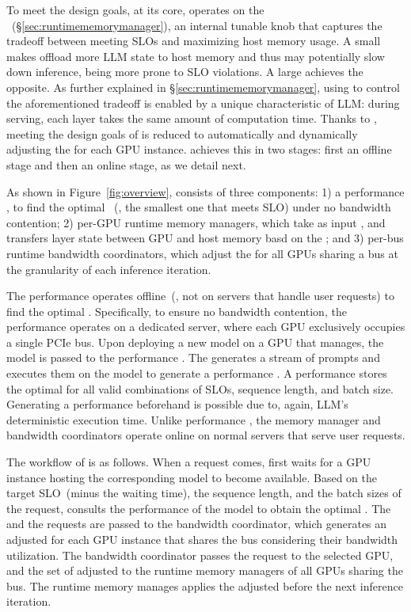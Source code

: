 %
%
To meet the design goals, at its core, \sys operates on the \interval~(\S\ref{sec:runtimememorymanager}), 
an internal tunable knob that captures the tradeoff between 
meeting SLOs and maximizing host memory usage. 
%
A small \interval makes \sys offload more LLM state to host memory and thus 
may potentially slow down inference, being more prone to SLO violations.  
%
A large \interval achieves the opposite. 
%
As further explained in \S\ref{sec:runtimememorymanager}, using \interval to control 
the aforementioned tradeoff is enabled by a unique characteristic of LLM: 
during serving, each layer takes the same amount of computation time. 
%
Thanks to \interval, meeting the design goals of \sys is reduced to automatically and dynamically adjusting the \interval for each GPU instance. 
%
\sys achieves this in two stages: first an offline stage and then 
an online stage, as we detail next. 

As shown in Figure~\ref{fig:overview}, \sys consists of three components: 1) a performance 
\analyzer, to find the optimal \interval~(\ie, the smallest one that meets SLO) under no bandwidth contention; 2) per-GPU runtime memory 
managers, which take as input \interval, and transfers layer state between GPU 
and host memory basd on the \interval; and 3) per-bus runtime 
bandwidth coordinators, which adjust the \interval for all GPUs 
sharing a bus at the granularity of each inference iteration. 
%

The performance \analyzer operates offline~(\ie, not on servers that handle user requests) to find the optimal \interval.
%
Specifically, to ensure no bandwidth contention, the performance 
\analyzer operates on a dedicated server,
where each GPU exclusively occupies a single PCIe bus.
%
Upon deploying a new model on a GPU that \sys manages, the model is passed to the performance \analyzer. 
%
The \analyzer generates a stream
of prompts and executes them on the model to generate a performance \record. 
%
A performance \record stores the optimal \interval for all valid combinations of SLOs, sequence length, and batch size. 
%
Generating a performance \record beforehand is possible due to, again, LLM's deterministic execution time. 
%
Unlike performance \analyzer, the memory manager and bandwidth coordinators operate online on normal servers that serve user requests. 



The workflow of \sys is as follows.
%
When a request comes,
%
\sys first waits for a GPU instance hosting the corresponding model to become available.
%
%
Based on the target SLO~(minus the waiting time), the 
sequence length, and the batch sizes of the request, 
\sys consults the performance \record of the model to obtain the optimal
\interval. 
%
%
The \interval and the requests are passed to the bandwidth coordinator, which 
generates an adjusted \interval for each GPU instance that shares the bus considering their bandwidth utilization. 
%
%
The bandwidth coordinator passes the request to the selected GPU, and the 
set of adjusted \interval to the runtime memory managers of all GPUs sharing the bus. 
%
The runtime memory manages applies the adjusted \interval before the next inference iteration. 
%


